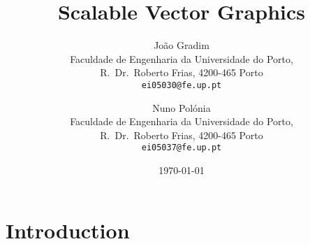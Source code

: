 \documentclass[twocolumn,twoside,10pt,a4paper]{article}
\title{Scalable Vector Graphics}
\author{João Gradim\\
\small Faculdade de Engenharia da Universidade do Porto,\\[-0.8ex]
\small R.\ Dr.\ Roberto Frias, 4200-465 Porto\\[-0.8ex]
\small \texttt{ei05030@fe.up.pt}\\
\and
Nuno Polónia\\
\small Faculdade de Engenharia da Universidade do Porto,\\[-0.8ex]
\small R.\ Dr.\ Roberto Frias, 4200-465 Porto\\[-0.8ex]
\small \texttt{ei05037@fe.up.pt}
}
\date{\today}
\begin{document}
\maketitle
\thispagestyle{plain}

\begin{abstract}
\end{abstract}

\section{Introduction}\label{sec:intro}

\renewcommand{\bibname}{Referências}


\end{document}
